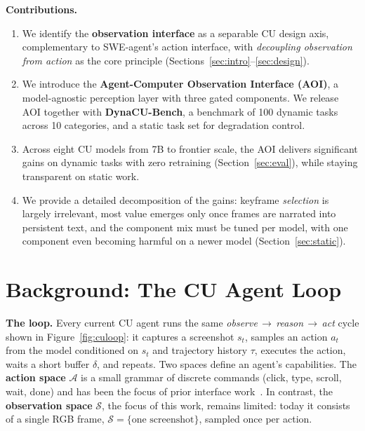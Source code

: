 \documentclass[11pt]{article}
\begin{document}
\textbf{Contributions.}
\begin{enumerate}
  \item We identify the \textbf{observation interface} as a separable CU design axis, complementary to SWE-agent's action interface, with \emph{decoupling observation from action} as the core principle (Sections~\ref{sec:intro}--\ref{sec:design}).
  \item We introduce the \textbf{Agent-Computer Observation Interface (AOI)}, a model-agnostic perception layer with three gated components. We release AOI together with \textbf{DynaCU-Bench}, a benchmark of 100 dynamic tasks across 10 categories, and a static task set for degradation control.
  \item Across eight CU models from 7B to frontier scale, the AOI delivers significant gains on dynamic tasks with zero retraining (Section~\ref{sec:eval}), while staying transparent on static work.
  \item We provide a detailed decomposition of the gains: keyframe \emph{selection} is largely irrelevant, most value emerges only once frames are narrated into persistent text, and the component mix must be tuned per model, with one component even becoming harmful on a newer model (Section~\ref{sec:static}).
\end{enumerate}

\section{Background: The CU Agent Loop}
\label{sec:background}


\textbf{The loop.}
Every current CU agent runs the same \emph{observe\,$\to$\,reason\,$\to$\,act}
cycle shown in Figure~\ref{fig:culoop}: it captures a screenshot $s_t$, samples an action
$a_t$ from the model conditioned on $s_t$ and trajectory history $\tau$, executes
the action, waits a short buffer $\delta$, and repeats.
Two spaces define an agent's capabilities.
The \textbf{action space} $\mathcal{A}$ is a small grammar of discrete commands (click, type, scroll,
wait, done) and has been the focus of prior interface work~\citep{sweagent}.
In contrast, the \textbf{observation space} $\mathcal{S}$, the focus of this work, remains limited: today it consists of a single RGB frame, $\mathcal{S}=\{\text{one screenshot}\}$, sampled once per
action.
\end{document}
